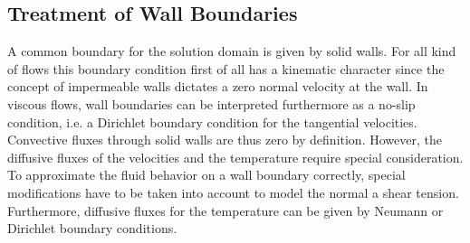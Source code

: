 \subsection{Treatment of Wall Boundaries}
\label{sec:walls}
    
A common boundary for the solution domain is given by solid walls. For all kind of flows this boundary condition first of all has a kinematic character since the concept of impermeable walls dictates a zero normal velocity at the wall. In viscous flows, wall boundaries can be interpreted furthermore as a no-slip condition, i.e. a Dirichlet boundary condition for the tangential velocities. Convective fluxes through solid walls are thus zero by definition. However, the diffusive fluxes of the velocities and the temperature require special consideration. To approximate the fluid behavior on a wall boundary correctly, special modifications have to be taken into account to model the normal a shear tension. Furthermore, diffusive fluxes for the temperature can be given by Neumann or Dirichlet boundary conditions.

